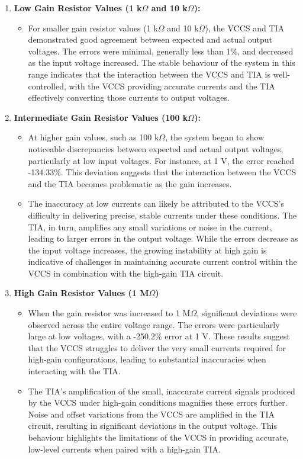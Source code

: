 \documentclass[conference]{IEEEtran}
\begin{document}
\begin{enumerate}
    \item \textbf{Low Gain Resistor Values (1 k$\Omega$ and 10 k$\Omega$):}
    \begin{itemize}
        \item For smaller gain resistor values (1 k$\Omega$ and 10 k$\Omega$), the VCCS and TIA demonstrated good agreement between expected and actual output voltages. The errors were minimal, generally less than 1\%, and decreased as the input voltage increased. The stable behaviour of the system in this range indicates that the interaction between the VCCS and TIA is well-controlled, with the VCCS providing accurate currents and the TIA effectively converting those currents to output voltages.\\
    \end{itemize}
    \item \textbf{Intermediate Gain Resistor Values (100 k$\Omega$):}
    \begin{itemize}
        \item At higher gain values, such as 100 k$\Omega$, the system began to show noticeable discrepancies between expected and actual output voltages, particularly at low input voltages. For instance, at 1 V, the error reached -134.33\%. This deviation suggests that the interaction between the VCCS and the TIA becomes problematic as the gain increases.
        \item The inaccuracy at low currents can likely be attributed to the VCCS’s difficulty in delivering precise, stable currents under these conditions. The TIA, in turn, amplifies any small variations or noise in the current, leading to larger errors in the output voltage. While the errors decrease as the input voltage increases, the growing instability at high gain is indicative of challenges in maintaining accurate current control within the VCCS in combination with the high-gain TIA circuit.
    \end{itemize}
    \item \textbf{High Gain Resistor Values (1 M$\Omega$)}
    \begin{itemize}
        \item When the gain resistor was increased to 1 M$\Omega$, significant deviations were observed across the entire voltage range. The errors were particularly large at low voltages, with a -250.2\% error at 1 V. These results suggest that the VCCS struggles to deliver the very small currents required for high-gain configurations, leading to substantial inaccuracies when interacting with the TIA.
        \item The TIA’s amplification of the small, inaccurate current signals produced by the VCCS under high-gain conditions magnifies these errors further. Noise and offset variations from the VCCS are amplified in the TIA circuit, resulting in significant deviations in the output voltage. This behaviour highlights the limitations of the VCCS in providing accurate, low-level currents when paired with a high-gain TIA.\\
    \end{itemize}
\end{enumerate}
\end{document}
